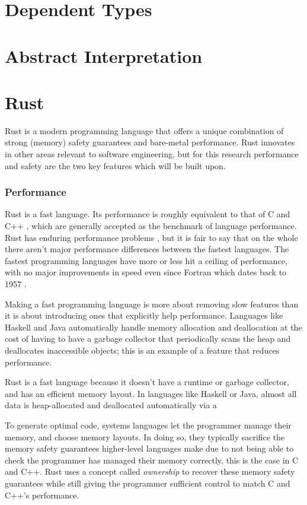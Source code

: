 \documentclass[12pt,twoside]{report}
\begin{document}
\section{Dependent Types}

\section{Abstract Interpretation}

\section{Rust}
Rust is a modern programming language that offers a unique combination of strong (memory) safety guarantees and bare-metal performance. Rust innovates in other areas relevant to software engineering, but for this research performance and safety are the two key features which will be built upon.

\subsubsection{Performance}
Rust is a fast language. Its performance is roughly equivalent to that of C and C++ \cite{RustVsWhich}, which are generally accepted as the benchmark of language performance. Rust has enduring performance problems \cite{AreWeStackefficient2022}, but it is fair to say that on the whole there aren't major performance differences between the fastest languages. The fastest programming languages have more or less hit a ceiling of performance, with no major improvements in speed even since Fortran \cite{GccVsClassic} which dates back to 1957 \cite[p. 16]{wilsonComparativeProgrammingLanguages2001}.

Making a fast programming language is more about removing slow features than it is about introducing ones that explicitly help performance. Languages like Haskell and Java automatically handle memory allocation and deallocation at the cost of having to have a garbage collector that periodically scans the heap and deallocates inaccessible objects; this is an example of a feature that reduces performance.

Rust is a fast language because it doesn't have a runtime or garbage collector, and has an efficient memory layout. In languages like Haskell or Java, almost all data is heap-allocated and deallocated automatically via a 

To generate optimal code, systems languages let the programmer manage their memory, and choose memory layouts. In doing so, they typically sacrifice the memory safety guarantees higher-level languages make due to not being able to check the programmer has managed their memory correctly, this is the case in C and C++. Rust uses a concept called \textit{ownership} to recover these memory safety guarantees while still giving the programmer sufficient control to match C and C++'s performance.
\end{document}
